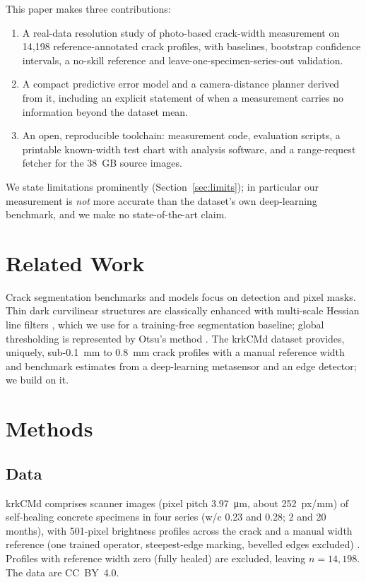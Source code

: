\documentclass[conference]{IEEEtran}
\begin{document}
This paper makes three contributions:
\begin{enumerate}
\item A real-data resolution study of photo-based crack-width measurement on 14{,}198 reference-annotated crack profiles, with baselines, bootstrap confidence intervals, a no-skill reference and leave-one-specimen-series-out validation.
\item A compact predictive error model and a camera-distance planner derived from it, including an explicit statement of when a measurement carries no information beyond the dataset mean.
\item An open, reproducible toolchain: measurement code, evaluation scripts, a printable known-width test chart with analysis software, and a range-request fetcher for the 38~GB source images.
\end{enumerate}
We state limitations prominently (Section~\ref{sec:limits}); in particular our measurement is \emph{not} more accurate than the dataset's own deep-learning
benchmark, and we make no state-of-the-art claim.

\section{Related Work}
Crack segmentation benchmarks and models \cite{liu2019deepcrack,dorafshan2018sdnet,ozgenel2018isarc,ronneberger2015unet} focus on detection
and pixel masks. Thin dark curvilinear structures are classically enhanced with multi-scale Hessian line filters
\cite{sato1998line,frangi1998vessel}, which we use for a training-free segmentation baseline; global thresholding is represented
by Otsu's method \cite{otsu1979threshold}. The krkCMd dataset \cite{jakubowski2025krkcmd} provides, uniquely, sub-0.1~mm to 0.8~mm
crack profiles with a manual reference width and benchmark estimates from a deep-learning metasensor and an edge detector; we build on it.

\section{Methods}
\subsection{Data}
krkCMd comprises scanner images (pixel pitch \SI{3.97}{\micro\metre}, about 252~px/mm) of self-healing concrete specimens in four series
(w/c 0.23 and 0.28; 2 and 20 months), with 501-pixel brightness profiles across the crack and a manual width reference
(one trained operator, steepest-edge marking, bevelled edges excluded) \cite{jakubowski2025krkcmd}. Profiles with reference width zero (fully healed) are excluded,
leaving $n=14{,}198$. The data are CC~BY~4.0.
\end{document}
